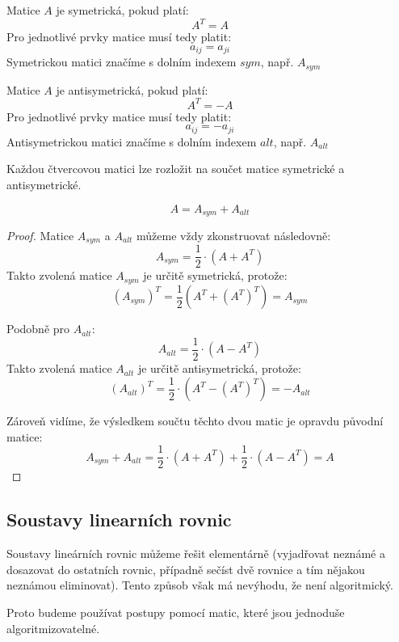 \begin{definition}
    Matice $A$ je symetrická, pokud platí:
    $$A^T = A$$
    Pro jednotlivé prvky matice musí tedy platit:
    $$a_{ij} = a_{ji}$$
    Symetrickou matici značíme s dolním indexem $sym$, např. $A_{sym}$
\end{definition}

\begin{definition}
    Matice $A$ je antisymetrická, pokud platí:
    $$A^T = -A$$
    Pro jednotlivé prvky matice musí tedy platit:
    $$a_{ij} = -a_{ji}$$
    Antisymetrickou matici značíme s dolním indexem $alt$, např. $A_{alt}$
\end{definition}

\begin{theorem}
    Každou čtvercovou matici lze rozložit na součet matice symetrické a antisymetrické.

    $$A = A_{sym} + A_{alt}$$
\end{theorem}
\begin{proof}
    Matice $A_{sym}$ a $A_{alt}$ můžeme vždy zkonstruovat následovně:
    $$A_{sym} = \frac{1}{2} \cdot (A + A^T)$$
    Takto zvolená matice $A_{sym}$ je určitě symetrická, protože:
    $$(A_{sym})^T = \frac{1}{2}(A^T + (A^T)^T) = A_{sym}$$

    Podobně pro $A_{alt}$:
    $$A_{alt} = \frac{1}{2}\cdot (A - A^T)$$
    Takto zvolená matice $A_{alt}$ je určitě antisymetrická, protože:
    $$(A_{alt})^T = \frac{1}{2} \cdot (A^T - (A^T)^T) = - A_{alt}$$

    Zároveň vidíme, že výsledkem součtu těchto dvou matic je opravdu původní matice:
    $$A_{sym} + A_{alt} = \frac{1}{2} \cdot (A + A^T) + \frac{1}{2}\cdot (A - A^T) = A$$
\end{proof}

\subsection{Soustavy linearních rovnic}
Soustavy lineárních rovnic můžeme řešit elementárně (vyjadřovat neznámé a dosazovat
do ostatních rovnic, případně sečíst dvě rovnice a tím nějakou neznámou eliminovat). Tento
způsob však má nevýhodu, že není algoritmický.

Proto budeme používat postupy pomocí matic, které jsou jednoduše algoritmizovatelné.

